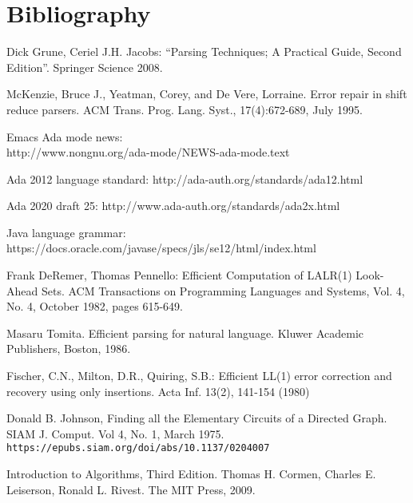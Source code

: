 \documentclass{article}
\begin{document}
\section{Bibliography}
\begin{thebibliography}{9}

 Dick Grune, Ceriel J.H. Jacobs: ``Parsing Techniques; A Practical Guide, Second
  Edition''. Springer Science  2008.

 McKenzie, Bruce J., Yeatman, Corey, and De
  Vere, Lorraine. Error repair in shift reduce parsers. ACM Trans.
  Prog. Lang. Syst., 17(4):672-689, July 1995.

Emacs Ada mode news:\\
  http://www.nongnu.org/ada-mode/NEWS-ada-mode.text

Ada 2012 language standard:
  http://ada-auth.org/standards/ada12.html

Ada 2020 draft 25: http://www.ada-auth.org/standards/ada2x.html

Java language grammar:
  https://docs.oracle.com/javase/specs/jls/se12/html/index.html

 Frank DeRemer, Thomas Pennello: Efficient
  Computation of LALR(1) Look-Ahead Sets. ACM Transactions on
  Programming Languages and Systems, Vol. 4, No. 4, October 1982,
  pages 615-649.

 Masaru Tomita. Efficient parsing for natural language. Kluwer Academic Publishers, Boston, 1986.

  Fischer, C.N., Milton, D.R., Quiring, S.B.:
  Efficient LL(1) error correction and recovery using only insertions.
  Acta Inf. 13(2), 141-154 (1980)

 Donald B. Johnson, Finding all the Elementary Circuits of a Directed Graph.
SIAM J. Comput. Vol 4, No. 1, March 1975.\\ \verb|https://epubs.siam.org/doi/abs/10.1137/0204007|

 Introduction to Algorithms, Third Edition.
    Thomas H. Cormen, Charles E. Leiserson, Ronald L. Rivest. The MIT
    Press, 2009.

\end{thebibliography}
\end{document}
